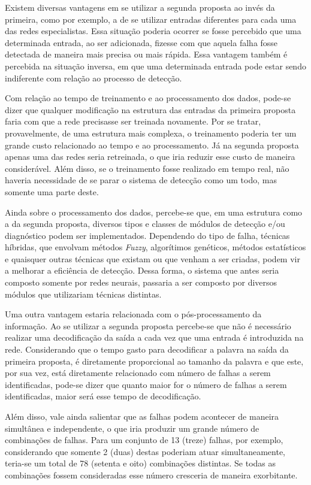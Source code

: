 Existem diversas vantagens em se utilizar a segunda proposta ao invés da
primeira, como por exemplo, a de se utilizar entradas diferentes para cada uma
das redes especialistas. Essa situação poderia ocorrer se fosse percebido que
uma determinada entrada, ao ser adicionada, fizesse com que aquela falha fosse
detectada de maneira mais precisa ou mais rápida. Essa vantagem também é
percebida na situação inversa, em que uma determinada entrada pode estar sendo
indiferente com relação ao processo de detecção.

Com relação ao tempo de treinamento e ao processamento dos dados, pode-se dizer
que qualquer modificação na estrutura das entradas da primeira proposta faria
com que a rede precisasse ser treinada novamente. Por se tratar, provavelmente,
de uma estrutura mais complexa, o treinamento poderia ter um grande custo
relacionado ao tempo e ao processamento. Já na segunda proposta apenas uma das
redes seria retreinada, o que iria reduzir esse custo de maneira considerável.
Além disso, se o treinamento fosse realizado em tempo real, não haveria
necessidade de se parar o sistema de detecção como um todo, mas somente uma
parte deste. 

Ainda sobre o processamento dos dados, percebe-se que, em uma estrutura como a
da segunda proposta, diversos tipos e classes de módulos de detecção e/ou
diagnóstico podem ser implementados. Dependendo do tipo de falha, técnicas
híbridas, que envolvam métodos {\it Fuzzy}, algorítimos genéticos, métodos
estatísticos e quaisquer outras técnicas que existam ou que venham a ser
criadas, podem vir a melhorar a eficiência de detecção. Dessa forma, o sistema
que antes seria composto somente por redes neurais, passaria a ser composto por
diversos módulos que utilizariam técnicas distintas.

Uma outra vantagem estaria relacionada com o pós-processamento da informação. Ao
se utilizar a segunda proposta percebe-se que não é necessário realizar uma
decodificação da saída a cada vez que uma entrada é introduzida na rede.
Considerando que o tempo gasto para decodificar a palavra na saída da primeira
proposta, é diretamente proporcional ao tamanho da palavra e que este, por sua
vez, está diretamente relacionado com número de falhas a serem identificadas,
pode-se dizer que quanto maior for o número de falhas a serem identificadas,
maior será esse tempo de decodificação.

Além disso, vale ainda salientar que as falhas podem acontecer de maneira
simultânea e independente, o que iria produzir um grande número de combinações
de falhas. Para um conjunto de 13 (treze) falhas, por exemplo, considerando que
somente 2 (duas) destas poderiam atuar simultaneamente, teria-se um total de 78
(setenta e oito) combinações distintas. Se todas as combinações fossem
consideradas esse número cresceria de maneira exorbitante.

